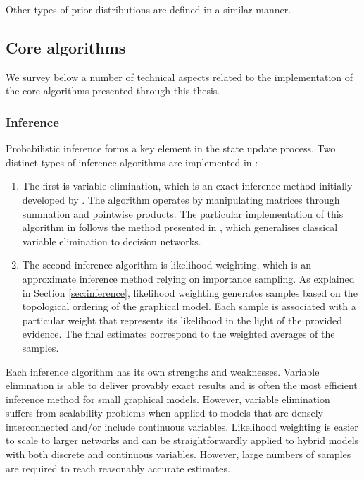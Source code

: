 Other types of prior distributions are defined in a similar manner. 

\subsection{Core algorithms}
\label{sec:corealgorithms}

We survey below a number of technical aspects related to the \opendial{} implementation of the core algorithms presented through this thesis.  

\subsubsection*{Inference}

Probabilistic inference forms a key element in the state update process.  Two distinct types of inference algorithms are implemented in \opendial{}: \begin{enumerate}
\item The first is variable elimination, which is an exact inference method initially developed by \cite{ZhangP96}.  The algorithm operates by manipulating matrices through summation and pointwise products. The particular implementation of this algorithm in \opendial{} follows the method presented in \cite[][p. 1101]{Koller+Friedman:09}, which generalises classical variable elimination to decision networks.
\item The second inference algorithm is likelihood weighting, which is an approximate inference method relying on importance sampling. As explained in Section \ref{sec:inference}, likelihood weighting generates samples based on the topological ordering of the graphical model. Each sample is associated with a particular weight that represents its likelihood in the light of the provided evidence.  The final estimates correspond to the weighted averages of the samples. 
\end{enumerate}

Each inference algorithm has its own strengths and weaknesses. Variable elimination is able to deliver provably exact results and is often the most efficient inference method for small graphical models.  However, variable elimination suffers from scalability problems when applied to models that are densely interconnected and/or include continuous variables. Likelihood weighting is easier to scale to larger networks and can be straightforwardly applied to hybrid models with both discrete and continuous variables. However, large numbers of samples are required to reach reasonably accurate estimates.

